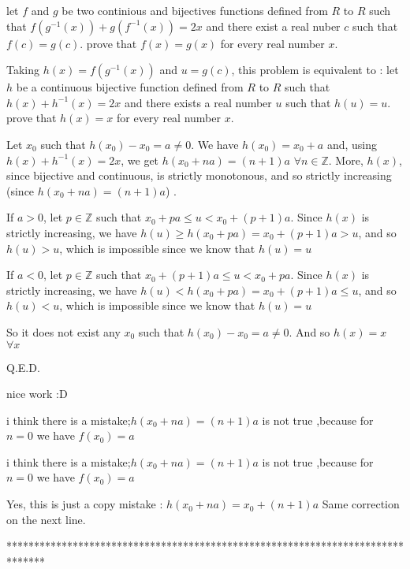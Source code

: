 \begin{solution}
	\begin{tcolorbox}let $ f$ and $ g$ be two continious and bijectives functions defined from $ R$  to $ R$ such that $ f(g^{ - 1}(x)) + g(f^{ - 1}(x)) = 2x$ and there exist a real nuber $ c$ such that $ f(c) = g(c).$
prove that $ f(x) = g(x)$ for every real number $ x$.\end{tcolorbox}

Taking $ h(x)=f(g^{-1}(x))$ and $ u=g(c)$, this problem is equivalent to :
let $ h$ be a continuous bijective function defined from $ R$  to $ R$ such that $ h(x) + h^{ - 1}(x) = 2x$ and there exists a real number $ u$ such that $ h(u)=u.$
prove that $ h(x) = x$ for every real number $ x$.

Let $ x_0$ such that $ h(x_0)-x_0=a\neq 0$. We have $ h(x_0)=x_0+a$ and, using $ h(x) + h^{ - 1}(x) = 2x$, we get $ h(x_0+na)=(n+1)a$ $ \forall n\in\mathbb{Z}$. 
More, $ h(x)$, since bijective and continuous, is strictly monotonous, and so strictly increasing (since $ h(x_0+na)=(n+1)a$) .

If $ a>0$, let $ p\in\mathbb{Z}$ such that $ x_0+pa\leq u<x_0+(p+1)a$. Since $ h(x)$ is strictly increasing, we have $ h(u)\geq h(x_0+pa)=x_0+(p+1)a>u$, and so $ h(u)>u$, which is impossible since we know that $ h(u)=u$

If $ a<0$, let $ p\in\mathbb{Z}$ such that $ x_0+(p+1)a\leq u<x_0+pa$. Since $ h(x)$ is strictly increasing, we have $ h(u)< h(x_0+pa)=x_0+(p+1)a\leq u$,  and so $ h(u)<u$, which is impossible since we know that $ h(u)=u$

So it does not exist any $ x_0$ such that $ h(x_0)-x_0=a\neq 0$. And so $ \boxed{h(x)=x}$ $ \forall x$

Q.E.D.
\end{solution}



\begin{solution}
	nice work  :D
\end{solution}



\begin{solution}
	i think there is a mistake;$ h(x_0+na)=(n+1)a$ is not true ,because for $ n=0$ we have $ f(x_0)=a$
\end{solution}



\begin{solution}
	\begin{tcolorbox}i think there is a mistake;$ h(x_0 + na) = (n + 1)a$ is not true ,because for $ n = 0$ we have $ f(x_0) = a$\end{tcolorbox}

Yes, this is just a copy mistake : $ h(x_0 + na) = x_0+(n + 1)a$
Same correction on the next line.
\end{solution}
*******************************************************************************
